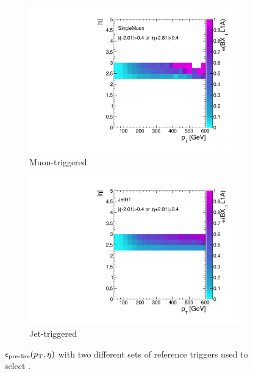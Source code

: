 \begin{figure}[]
    \begin{center}
        \begin{subfigure}[t]{0.49\textwidth}
            \includegraphics[width=\textwidth]{figures/vbf/triggers/SingleMuon_spike_finor_pteta_ratio.pdf}
            \caption{Muon-triggered}
        \end{subfigure}
        \begin{subfigure}[t]{0.49\textwidth}
            \includegraphics[width=\textwidth]{figures/vbf/triggers/JetHT_spike_finor_pteta_ratio.pdf}
            \caption{Jet-triggered}
        \end{subfigure}
        \caption{$\epsilon_\text{pre-fire}(p_\mathrm{T},\eta)$ with two different sets of reference triggers used to select .}
        \label{fig:vbf:pre_eff2_pteta}
    \end{center}
\end{figure}

